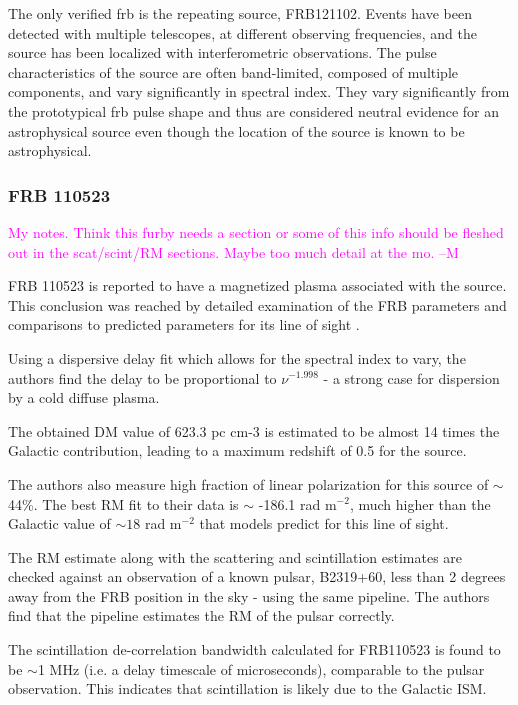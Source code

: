 \documentclass[a4paper,fleqn,usenatbib]{mnras}
\newcommand{\cM}[1]{\textcolor{magenta}{ #1 --M}}
\begin{document}
The only verified \gls{frb} is the repeating source, FRB121102. Events have been
detected with multiple telescopes, at different observing frequencies, and the
source has been localized with interferometric observations. The pulse
characteristics of the source are often band-limited, composed of multiple
components, and vary significantly in spectral index. They vary significantly
from the prototypical \gls{frb} pulse shape and thus are considered neutral
evidence for an astrophysical source even though the location of the source is
known to be astrophysical. 

\subsubsection{FRB 110523}
\cM{My notes. Think this furby needs a section or some of this info should be
fleshed out in the scat/scint/RM sections. Maybe too much detail at the mo.}

FRB 110523 is reported to have a magnetized plasma associated with the source.
This conclusion was reached by detailed examination of the FRB parameters and
comparisons to predicted parameters for its line of sight \cite{}.

Using a dispersive delay fit which allows for the spectral index to vary, the
authors find the delay to be proportional to $\nu^{-1.998}$  - a strong case for
dispersion by a cold diffuse plasma. 

The obtained DM value of 623.3 pc cm-3 is estimated to be almost 14 times the
Galactic contribution, leading to a maximum redshift of 0.5 for the source.

The authors also measure high fraction of linear polarization for this source of
$\sim$ 44\%. The best RM fit to their data is $\sim$ -186.1 rad m$^{-2}$, much
higher than the Galactic value of $\sim 18$ rad m$^{-2}$ that models predict for
this line of sight.

The RM estimate along with the scattering and scintillation estimates are
checked against an observation of a known pulsar, B2319+60, less than 2 degrees
away from the FRB position in the sky - using the same pipeline. The authors
find that the pipeline estimates the RM of the pulsar correctly.

The scintillation de-correlation bandwidth calculated for FRB110523 is found to
be $\sim$1 MHz (i.e. a delay timescale of microseconds), comparable to the
pulsar observation. This indicates that scintillation is likely due to the
Galactic ISM.  
\end{document}

